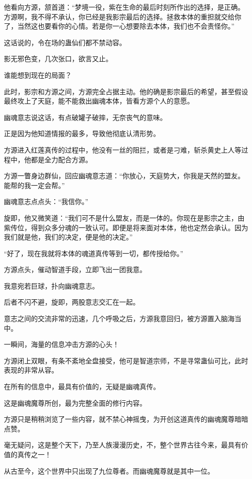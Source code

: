 \begin{this_body}
他看向方源，颔首道：“梦境一役，紫在生命的最后时刻所作出的选择，是正确。方源啊，我不得不承认，你已经是我影宗最后的选择。拯救本体的重担就交给你了，当然这也要看你的心情。若是你一心想要除去本体，我们也不会责怪你。”

这话说的，令在场的蛊仙们都不禁动容。

影无邪色变，几次张口，欲言又止。

谁能想到现在的局面？

此时，影宗和方源之间，方源完全占据主动。他的确是影宗最后的希望，甚至假设最终攻上了天庭，能不能救出幽魂本体，皆看方源个人的意愿。

幽魂意志说这话，有点破罐子破摔，无奈丧气的意味。

正是因为他知道情报的最多，导致他彻底认清形势。

方源进入红莲真传的过程中，他没有一丝的阻拦，或者是刁难，斩杀黄史上人等过程中，他都是全力配合方源。

方源一瞥身边群仙，回应幽魂意志道：“你放心，天庭势大，你我是天然的盟友。能帮的我一定会帮。”

幽魂意志点点头：“我信你。”

旋即，他又微笑道：“我们可不是什么盟友，而是一体的。你现在是影宗之主，由紫传位，得到众多分魂的一致认可。即便是将来面对本体，他也定然会承认。因为我们就是他，我们的决定，便是他的决定。”

“好了，现在我就将本体的魂道真传等到一切，都传授给你。”

方源点头，催动智道手段，立即飞出一团我意。

我意宛若巨球，扑向幽魂意志。

后者不闪不避，旋即，两股意志交汇在一起。

意志之间的交流非常的迅速，几个呼吸之后，方源我意回归，被方源置入脑海当中。

一瞬间，海量的信息冲击方源的心头！

方源闭上双眼，有条不紊地全盘接受，他可是智道宗师，不是寻常蛊仙可比，此时表现的非常从容。

在所有的信息中，最具有价值的，无疑是幽魂真传。

这是幽魂魔尊所创，最为完整全面的修行内容。

方源只是稍稍浏览了一些内容，就不禁心神摇曳，为开创这道真传的幽魂魔尊暗暗点赞。

毫无疑问，这是整个天下，乃至人族漫漫历史，不，整个世界古往今来，最具有价值的真传之一！

从古至今，这个世界中只出现了九位尊者。而幽魂魔尊就是其中一位。


\end{this_body}
